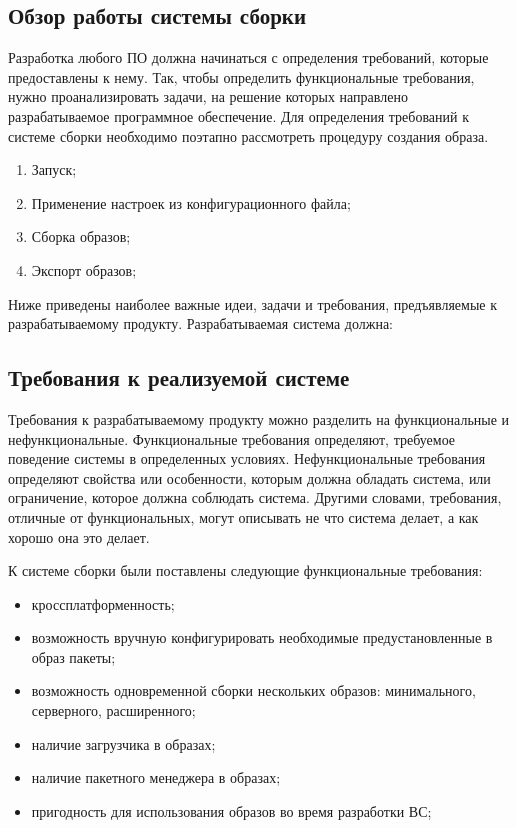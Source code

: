 \subsection{Обзор работы системы сборки}
\label{subsec:build-system-overview}
Разработка любого ПО должна начинаться с определения требований, которые предоставлены к нему\cite{REQUIREMENTS}.
Так, чтобы определить функциональные требования, нужно проанализировать задачи, на решение которых направлено разрабатываемое программное обеспечение.
Для определения требований к системе сборки необходимо поэтапно рассмотреть процедуру создания образа.

\begin{enumerate}
  \item Запуск;
  \item Применение настроек из конфигурационного файла;
  \item Сборка образов;
  \item Экспорт образов;
\end{enumerate}

Ниже приведены наиболее важные идеи, задачи и требования, предъявляемые к разрабатываемому продукту.
Разрабатываемая система должна:

\newpage
\subsection{Требования к реализуемой системе}

Требования к разрабатываемому продукту можно разделить на функциональные и нефункциональные\cite{REQUIREMENTS}.
Функциональные требования определяют, требуемое поведение системы в определенных условиях.
Нефункциональные требования определяют свойства или особенности, которым должна обладать система, или ограничение, которое должна соблюдать система.
Другими словами, требования, отличные от функциональных, могут описывать не что система делает, а как хорошо она это делает\cite{REQUIREMENTS}.

К системе сборки были поставлены следующие функциональные требования:
\begin{itemize}
  \item кроссплатформенность;
  \item возможность вручную конфигурировать необходимые предустановленные в образ пакеты;
  \item возможность одновременной сборки нескольких образов: минимального, серверного, расширенного;
  \item наличие загрузчика в образах;
  \item наличие пакетного менеджера в образах;
  \item пригодность для использования образов во время разработки ВС;
\end{itemize}
\newpage


